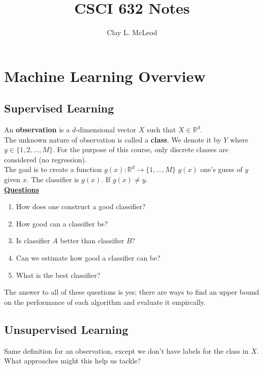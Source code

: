 \documentclass[12pt]{article}
\title{\textbf{CSCI 632 Notes}}
\author{Clay L. McLeod}
\newcommand{\aside}[1]{\noindent\textbf{\underline{#1}}}
\begin{document}
\maketitle

\section{Machine Learning Overview}

\subsection{Supervised Learning}

An \textbf{observation} is a $d$-dimensional vector $X$ such that $X \in \mathbb{R}^{d}$. 
\\

The unknown nature of observation is called a \textbf{class}. We denote it by $Y$ where $y \in \{1, 2, ..., M\}$. For the purpose of this course, only discrete classes are considered (no regression).
\\

The goal is to create a function $g(x): \mathbb{R}^{d} \rightarrow \{1, ..., M\}$ $g(x)$ one's guess of $y$ given $x$. The classifier is $g(x)$. If $g(x) \neq y$.
\\

\aside{Questions} 
\begin{enumerate}[noitemsep]
\item How does one construct a good classifier?
\item How good can a classifier be?
\item Is classifier $A$ better than classifier $B$?
\item Can we estimate how good a classifier can be?
\item What is the best classifier?
\end{enumerate}
    
The answer to all of these questions is yes: there are ways to find an upper bound on the performance of each algorithm and evaluate it empircally.

\subsection{Unsupervised Learning}

Same definition for an observation, except we don't have labels for the class in $X$. What approaches might this help us tackle? \\
\end{document}
